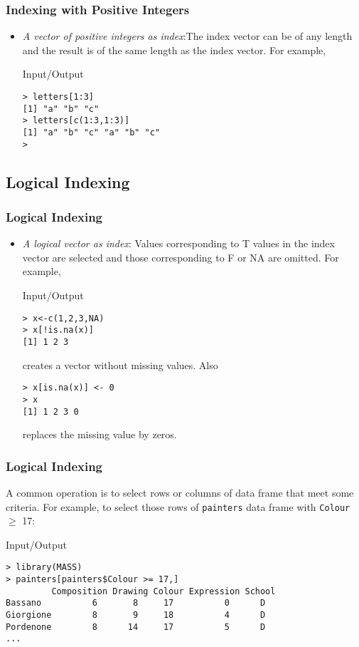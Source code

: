 \documentclass[xcolor={table},c]{beamer}
\begin{document}
\begin{frame}\frametitle{Indexing with Positive Integers}
\begin{itemize}
\item \emph{A vector of positive integers as index}:The index vector can be of any length and the result is of the same length as the index vector. For example,
\begin{exampleblock}{Input/Output}
\begin{verbatim}
> letters[1:3]
[1] "a" "b" "c"
> letters[c(1:3,1:3)]
[1] "a" "b" "c" "a" "b" "c"
>
\end{verbatim}
\end{exampleblock}
\end{itemize}
\end{frame}

\subsection{Logical Indexing}
\begin{frame}\frametitle{Logical Indexing}
\begin{itemize}
\item \emph{A logical vector as index}: Values corresponding to T values in the index vector are selected and those corresponding to F or NA are omitted. For example,
\begin{exampleblock}{Input/Output}
\begin{verbatim}
> x<-c(1,2,3,NA)
> x[!is.na(x)]
[1] 1 2 3
\end{verbatim}
creates a vector without missing values. Also
\begin{verbatim}
> x[is.na(x)] <- 0
> x
[1] 1 2 3 0
\end{verbatim}
replaces the missing value by zeros.
\end{exampleblock}
\end{itemize}
\end{frame}


\begin{frame}[fragile]\frametitle{Logical Indexing} %
A common operation is to select rows or columns of data frame that meet some criteria. For example, to select those rows of \texttt{painters} data frame with \texttt{Colour} $\geq$ 17:
\begin{exampleblock}{Input/Output}
\begin{verbatim}
> library(MASS)
> painters[painters$Colour >= 17,]
         Composition Drawing Colour Expression School
Bassano          6       8     17          0      D
Giorgione        8       9     18          4      D
Pordenone        8      14     17          5      D
...
\end{verbatim}
\end{exampleblock}
\end{frame}
\end{document}
